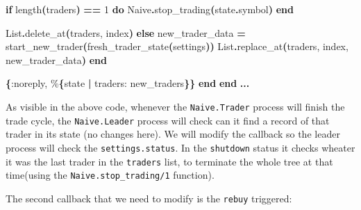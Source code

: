 \documentclass[
  oneside]{book}
\newenvironment{Shaded}{\begin{snugshade}}{\end{snugshade}}
\newcommand{\ConstantTok}[1]{\textcolor[rgb]{0.56,0.35,0.01}{#1}}
\newcommand{\ControlFlowTok}[1]{\textcolor[rgb]{0.13,0.29,0.53}{\textbf{#1}}}
\newcommand{\DecValTok}[1]{\textcolor[rgb]{0.00,0.00,0.81}{#1}}
\newcommand{\FunctionTok}[1]{\textcolor[rgb]{0.13,0.29,0.53}{\textbf{#1}}}
\newcommand{\KeywordTok}[1]{\textcolor[rgb]{0.13,0.29,0.53}{\textbf{#1}}}
\newcommand{\NormalTok}[1]{#1}
\newcommand{\OperatorTok}[1]{\textcolor[rgb]{0.81,0.36,0.00}{\textbf{#1}}}
\newcommand{\VariableTok}[1]{\textcolor[rgb]{0.00,0.00,0.00}{#1}}
\begin{document}
\begin{Shaded}
\begin{Highlighting}[]
            \ControlFlowTok{if}\NormalTok{ length}\FunctionTok{(}\NormalTok{traders}\FunctionTok{)} \OperatorTok{==} \DecValTok{1} \KeywordTok{do}
              \ConstantTok{Naive}\OperatorTok{.}\NormalTok{stop\_trading}\FunctionTok{(}\NormalTok{state}\OperatorTok{.}\NormalTok{symbol}\FunctionTok{)}
            \KeywordTok{end}
            
            \ConstantTok{List}\OperatorTok{.}\NormalTok{delete\_at}\FunctionTok{(}\NormalTok{traders, index}\FunctionTok{)}
          \ControlFlowTok{else}
\NormalTok{            new\_trader\_data }\OperatorTok{=}\NormalTok{ start\_new\_trader}\FunctionTok{(}\NormalTok{fresh\_trader\_state}\FunctionTok{(}\NormalTok{settings}\FunctionTok{))}
            \ConstantTok{List}\OperatorTok{.}\NormalTok{replace\_at}\FunctionTok{(}\NormalTok{traders, index, new\_trader\_data}\FunctionTok{)}
          \KeywordTok{end}

        \FunctionTok{\{}\VariableTok{:noreply}\NormalTok{, \%}\FunctionTok{\{}\NormalTok{state }\OperatorTok{|} \VariableTok{traders:}\NormalTok{ new\_traders}\FunctionTok{\}\}}
    \KeywordTok{end}
  \KeywordTok{end}
  \OperatorTok{...}
\end{Highlighting}
\end{Shaded}

As visible in the above code, whenever the \texttt{Naive.Trader} process will finish the trade cycle, the \texttt{Naive.Leader} process will check can it find a record of that trader in its state (no changes here). We will modify the callback so the leader process will check the \texttt{settings.status}. In the \texttt{shutdown} status it checks wheater it was the last trader in the \texttt{traders} list, to terminate the whole tree at that time(using the \texttt{Naive.stop\_trading/1} function).

The second callback that we need to modify is the \texttt{rebuy} triggered:
\end{document}
